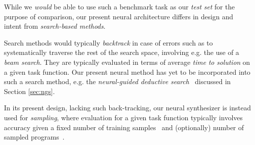 \documentclass{article}
\begin{document}

While we \emph{would} be able to use such a benchmark task as our \emph{test set} for the purpose of comparison,
our present neural architecture differs in design and intent from \emph{search-based methods}.

Search methods would typically \emph{backtrack} in case of errors such as to systematically traverse the rest of the search space,
involving e.g. the use of a \emph{beam search}.
They are typically evaluated in terms of average \emph{time to solution} on a given task function.
Our present neural method has yet to be incorporated into such a search method,
e.g. the \emph{neural-guided deductive search}~\citep{deepcoder} discussed in Section \ref{sec:ngs}.

In its present design, lacking such back-tracking,
our neural synthesizer is instead used for \emph{sampling},
where evaluation for a given task function typically involves accuracy given a fixed number of training samples~\citep{npi} and (optionally) number of sampled programs~\citep{nsps}.%


\end{document}
